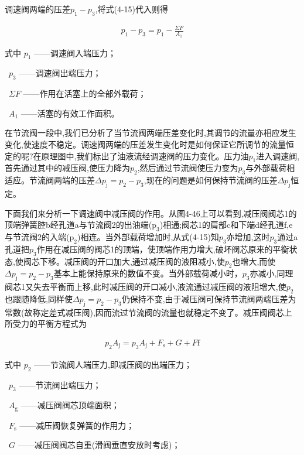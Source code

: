 调速阀两端的压差$p_1 - p_3$,将式(4-15)代入则得

\begin{equation}
\begin{split}
p_1 - p_3= p_1-\frac{\Sigma F}{A_1}
\end{split}
\end{equation}

\noindent
式中 $p_1$ ——调速阀入端压力；

\ $p_3$ ——调速阀出端压力；

\ $\Sigma F$ ——作用在活塞上的全部外载荷；

\ $A_1$ ——活塞的有效工作面积。

在节流阀一段中,我们已分析了当节流阀两端压差变化时,其调节的流量亦相应发生变化,使速度不稳定。调速阀两端的压差发生变化时是如何保证它所调节的流量恒定的呢?在原理图中,我们标出了油液流经调速阀的压力变化。压力油$p_1$进入调速阀,首先通过其中的减压阀,使压力降为$p_2$,然后通过节流阀使压力变为$p_3$与外部载荷相适应。节流阀两端的压差$\Delta p_\text{j}=p_2-p_3$,现在的问题是如何保持节流阀的压差$\Delta p_\text{j}$恒定。

下面我们来分析一下调速阀中减压阀的作用。从图4-46上可以看到,减压阀阀芯1的顶端弹簧腔b经孔道a与节流阀2的出油端($\text{p}_3$)相通;阀芯1的肩部c和下端d经孔道f,e与节流阀2的入端($\text{p}_2$)相连。当外部载荷增加时,从式(4-15)知$p_3$亦增加,这时$p_3$通过a孔道把$p_3$作用在减压阀的阀芯1的顶端，使顶端作用力增大,破坏阀芯原来的平衡状态,使阀芯下移。减压阀的开口加大,通过减压阀的液阻减小,使$p_2$也增大,而使$\Delta p_\text{j} = p_2-p_3$基本上能保持原来的数值不变。当外部载荷减小时，$p_3$亦减小,同理阀芯1又失去平衡而上移,此时减压阀的开口减小,液流通过减压阀的液阻增大,使$p_2$也跟随降低,同样使$\Delta p_\text{j} = p_2-p_3$仍保持不变,由于减压阀可保持节流阀两端压差为常数(故称定差式减压阀),因而流过节流阀的流量也就稳定不变了。减压阀阀芯上所受力的平衡方程式为

\begin{equation}
\begin{split}
p_2 A_\text{j} = p_3 A_\text{j} + F_\text{s} + G + F\text{f}
\end{split}
\end{equation}

\noindent
式中 $p_2$ ——节流阀人端压力,即减压阀的出端压力；

\ $p_3$ ——节流阀出端压力；

\ $A_\text{g}$ ——减压阀阀芯顶端面积；

\ $F_\text{s}$ ——减压阀恢复弹簧的作用力；

\ $G$ ——减压阀阀芯自重(滑阀垂直安放时考虑)；

